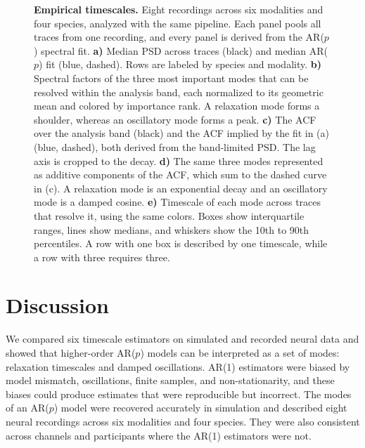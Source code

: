 \documentclass[pdflatex,lineno,sn-nature]{sn-jnl}
\theoremstyle{thmstyleone}
\theoremstyle{thmstyletwo}
\theoremstyle{thmstylethree}
\begin{document}
\begin{figure}[htbp]
\centering

\caption{\textbf{Empirical timescales.} Eight recordings across six modalities and four species, analyzed with the same pipeline. Each panel pools all traces from one recording, and every panel is derived from the AR($p$) spectral fit. \textbf{a)} Median PSD across traces (black) and median AR($p$) fit (blue, dashed). Rows are labeled by species and modality. \textbf{b)} Spectral factors of the three most important modes that can be resolved within the analysis band, each normalized to its geometric mean and colored by importance rank. A relaxation mode forms a shoulder, whereas an oscillatory mode forms a peak. \textbf{c)} The ACF over the analysis band (black) and the ACF implied by the fit in (a) (blue, dashed), both derived from the band-limited PSD. The lag axis is cropped to the decay. \textbf{d)} The same three modes represented as additive components of the ACF, which sum to the dashed curve in (c). A relaxation mode is an exponential decay and an oscillatory mode is a damped cosine. \textbf{e)} Timescale of each mode across traces that resolve it, using the same colors. Boxes show interquartile ranges, lines show medians, and whiskers show the 10th to 90th percentiles. A row with one box is described by one timescale, while a row with three requires three.}
\label{fig:realdata}
\end{figure}

\section{Discussion}\label{sec:discussion}

We compared six timescale estimators on simulated and recorded neural data and showed that higher-order AR($p$) models can be interpreted as a set of modes: relaxation timescales and damped oscillations. AR(1) estimators were biased by model mismatch, oscillations, finite samples, and non-stationarity, and these biases could produce estimates that were reproducible but incorrect. The modes of an AR($p$) model were recovered accurately in simulation and described eight neural recordings across six modalities and four species. They were also consistent across channels and participants where the AR(1) estimators were not.
\end{document}
